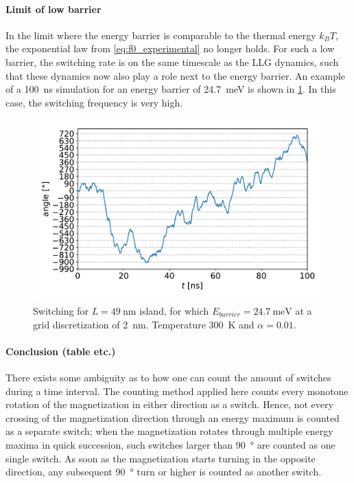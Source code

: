 \documentclass[12pt,a4paper]{article}
\begin{document}
\paragraph{Limit of low barrier}
In the limit where the energy barrier is comparable to the thermal energy $k_B T$, the exponential law from \cref{eq:f0_experimental} no longer holds. For such a low barrier, the switching rate is on the same timescale as the LLG dynamics, such that these dynamics now also play a role next to the energy barrier. An example of a \SI{100}{\nano\second} simulation for an energy barrier of \SI{24.7}{\milli\electronvolt} is shown in \cref{fig:switching-49x100-300}. In this case, the switching frequency is very high.
\begin{figure}
    \centering
    \includegraphics[width=0.9\columnwidth]{Figures/biaxial_island/Switching/49x100_300K_alpha0.01_100ns_2nm.pdf}
    \caption{Switching for $L=\SI{49}{\nano\metre}$ island, for which $E_{barrier}=\SI{24.7}{\milli\electronvolt}$ at a grid discretization of \SI{2}{\nano\metre}. Temperature \SI{300}{\kelvin} and $\alpha = 0.01$.}
    \label{fig:switching-49x100-300}
\end{figure}

\paragraph{Conclusion (table etc.)}
There exists some ambiguity as to how one can count the amount of switches during a time interval. The counting method applied here counts every monotone rotation of the magnetization in either direction as a switch. Hence, not every crossing of the magnetization direction through an energy maximum is counted as a separate switch; when the magnetization rotates through multiple energy maxima in quick succession, such switches larger than \SI{90}{\degree} are counted as one single switch. As soon as the magnetization starts turning in the opposite direction, any subsequent \SI{90}{\degree} turn or higher is counted as another switch.
\end{document}
